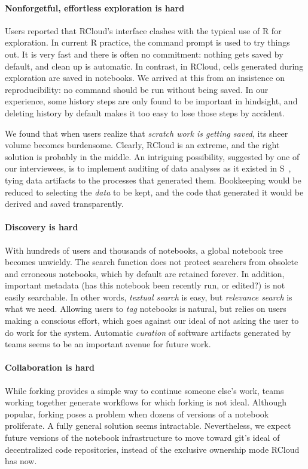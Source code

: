 \paragraph*{Nonforgetful, effortless exploration is hard}
Users reported that RCloud's interface clashes with the
typical use of R for exploration.
In current R practice, the command prompt is used to try things out.
It is very fast and there is often no commitment: nothing gets saved by
default, and clean up is automatic. In contrast, in RCloud,
cells generated during exploration are saved in notebooks.
We arrived at this from an insistence on reproducibility: 
no command should be run without being saved.
In our experience, some history steps are only found to be
important in hindsight, and deleting history by default makes
it too easy to lose those steps by accident.

We found that when users realize that \emph{scratch work
is getting saved}, its sheer volume becomes burdensome.
Clearly, RCloud is an extreme, and the right solution is
probably in the middle. An intriguing possibility,
suggested by one of our interviewees, is to implement auditing of data
analyses as it existed in S~\cite{Becker:1988:Auditing}, tying
data artifacts to the processes that generated them. 
Bookkeeping would be reduced to selecting the \emph{data} to be kept,
and the code that generated it would be derived and saved transparently.

\paragraph*{Discovery is hard} 
With hundreds of users and thousands of notebooks, a global notebook tree
becomes unwieldy. The search function does not protect searchers from
obsolete and erroneous notebooks, which by default are retained
forever. In addition, important metadata (has this notebook been
recently run, or edited?) is not easily searchable. In other words,
\emph{textual search} is easy, but \emph{relevance search} is what we
need. Allowing users to \emph{tag} notebooks is natural, but
relies on users making a conscious effort, which goes against
our ideal of not asking the user to do work for the system.
Automatic
\emph{curation} of
software artifacts generated by teams seems to be an important avenue
for future work.

\paragraph*{Collaboration is hard}
While forking provides a simple way to continue someone else's work,
teams working together generate workflows for which forking is not
ideal. Although popular, forking poses a problem when dozens of
versions of a notebook proliferate. A fully general solution seems
intractable. Nevertheless, we expect future versions of the
notebook infrastructure to move toward git's ideal of decentralized
code repositories, instead of the exclusive ownership mode RCloud has now.
